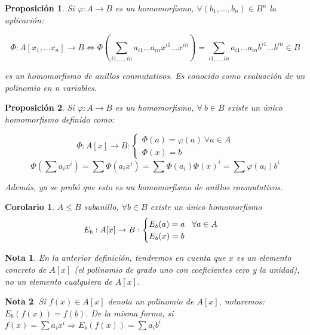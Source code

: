 \documentclass[11pt, a4paper, titlepage]{article}
\theoremstyle{theorem-style}
\newtheorem*{nprop}{Proposición}
\newtheorem{ncor}{Corolario}
\theoremstyle{definition-style}
\theoremstyle{remark-style}
\newtheorem*{nota}{Nota}
\theoremstyle{example-style}
\begin{document}
\begin{nprop}
	
Si $\varphi :A \to B$ es un homomorfismo, $\forall(b_1,...,b_n) \in B^n$ la aplicación:

\[
\Phi:A[x_1,...x_n] \to B \iff \Phi\left(\sum_{i1,...,in}a_{i1}...a_{in}x^{i1}... x^{in}\right) = \sum_{i1,...,in}a_{i1}...a_{in}b^{i1}... b^{in} \in B
\]

es un homomorfismo de anillos conmutativos. Es conocido como evaluación de un polinomio en n variables.

\end{nprop}



\begin{nprop}
	Si $\varphi:A \to B$ es un homomorfismo, $\forall\  b \in B$ existe un único homomorfismo definido como:
	
\[
\Phi:A[x] \to B : \begin{cases}
	\Phi(a) = \varphi(a)\ \forall a \in A \\
	\Phi(x) = b 
\end{cases}
\]
\[
\Phi\left(\sum a_i x^i\right) = \sum \Phi(a_i x^i) =  \sum \Phi(a_i) \Phi(x)^i = \sum \varphi(a_i) b^i
\]

Además, ya se probó que esto es un homomorfismo de anillos conmutativos.

\end{nprop}

\begin{ncor}
	$A \leq B$ subanillo, $\forall b \in B$ existe un único homomorfismo
\[
E_b: A[x] \to B: \begin{cases}
E_b(a) = a \hspace{0.3cm} \forall a \in A\\
E_b(x) = b
	
\end{cases}
\] 
\end{ncor}

\begin{nota}
	En la anterior definición, tendremos en cuenta que $x$ es un elemento concreto de $A[x]$ (el polinomio de grado uno con coeficientes cero y la unidad), no un elemento cualquiera de $A[x]$.
\end{nota}

\begin{nota}
	Si $f(x)\in A[x]$ denota un polinomio de $A[x]$, notaremos: $E_b(f(x)) = f(b)$.
	De la misma forma, si $f(x) = \sum a_i x^i \Rightarrow E_b(f(x)) = \sum a_i b^i$
\end{nota}
\end{document}
